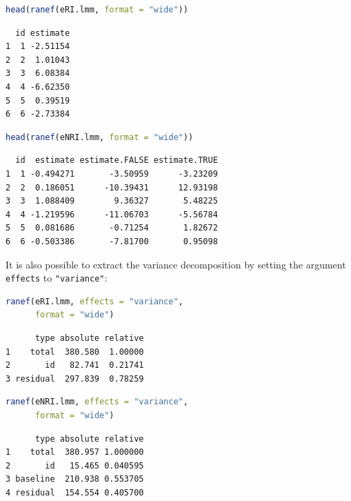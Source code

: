 \documentclass[12pt]{article}
\begin{document}
\bigskip

\begin{minipage}{0.48\linewidth}
\begin{lstlisting}[language=r,numbers=none]
head(ranef(eRI.lmm, format = "wide"))
\end{lstlisting}

\label{}
\begin{verbatim}
  id estimate
1  1 -2.51154
2  2  1.01043
3  3  6.08384
4  4 -6.62350
5  5  0.39519
6  6 -2.73384
\end{verbatim}

\end{minipage}
\begin{minipage}{0.48\linewidth}
\begin{lstlisting}[language=r,numbers=none]
head(ranef(eNRI.lmm, format = "wide"))
\end{lstlisting}

\label{}
\begin{verbatim}
  id  estimate estimate.FALSE estimate.TRUE
1  1 -0.494271       -3.50959      -3.23209
2  2  0.186051      -10.39431      12.93198
3  3  1.088409        9.36327       5.48225
4  4 -1.219596      -11.06703      -5.56784
5  5  0.081686       -0.71254       1.82672
6  6 -0.503386       -7.81700       0.95098
\end{verbatim}

\end{minipage}


It is also possible to extract the variance decomposition by setting
the argument \texttt{effects} to \texttt{"variance"}:

\medskip

\begin{minipage}{0.47\linewidth}
\begin{lstlisting}[language=r,numbers=none]
ranef(eRI.lmm, effects = "variance",
      format = "wide")
\end{lstlisting}

\label{}
\begin{verbatim}
      type absolute relative
1    total  380.580  1.00000
2       id   82.741  0.21741
3 residual  297.839  0.78259

\end{verbatim}

\end{minipage}
\begin{minipage}{0.47\linewidth}
\begin{lstlisting}[language=r,numbers=none]
ranef(eNRI.lmm, effects = "variance",
      format = "wide")
\end{lstlisting}

\label{}
\begin{verbatim}
      type absolute relative
1    total  380.957 1.000000
2       id   15.465 0.040595
3 baseline  210.938 0.553705
4 residual  154.554 0.405700
\end{verbatim}

\end{minipage}
\end{document}
